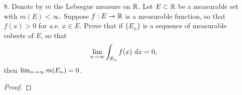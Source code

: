 \begin{itemize}
\begin{enumerate}[(a)]
    \item Prove that $m(\{x \in \bbr : |f(x)| = \infty \}) = 0$.
    \begin{proof}

    \end{proof}
\end{enumerate}






\item[8.] Denote by $m$ the Lebesgue measure on $\mathbb{R}$. Let $E \subset \mathbb{R}$ be a measurable
set with $m(E) < \infty$. Suppose $f : E \rightarrow \mathbb{R}$ is a measurable function, so that $f(x) > 0$ for a.e.
$x \in E$. Prove that if $\{E_n\}$ is a sequence of measurable subsets of $E$, so that
$$\lim_{n \rightarrow \infty} \int_{E_n} f(x) \ dx = 0,$$
then $\lim_{n \rightarrow \infty} m(E_n) = 0$.
\begin{proof}

\end{proof}











\end{itemize}